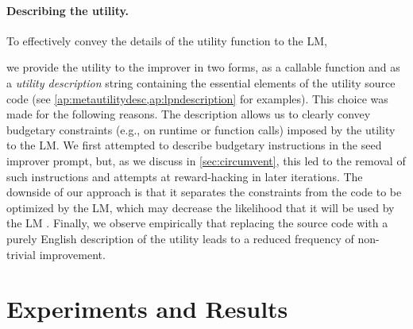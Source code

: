 \documentclass{article}
\begin{document}
 

\paragraph{Describing the utility.} 
To effectively convey the details of the utility function to the LM,  

we provide the utility to the improver in two forms, as a callable function and as a \emph{utility description} string containing the essential elements of the utility source code (see \cref{ap:metautilitydesc,ap:lpndescription} for examples). 
This choice was made for the following reasons. 
The description allows us to clearly convey budgetary constraints (e.g., on runtime or function calls) imposed by the utility to the LM. We first attempted to describe budgetary instructions in the seed improver prompt, but, as we discuss in \cref{sec:circumvent}, this led to the removal of such instructions and attempts at reward-hacking in later iterations. 
The downside of our approach is that it separates the constraints from the code to be optimized by the LM, which may decrease the likelihood that it will be used by the LM \citep{liu2023lost}.
Finally, we observe empirically that replacing the source code with a purely English description of the utility leads to a reduced frequency of non-trivial improvement.











\section{Experiments and Results}


\label{sec:experiments}
\end{document}

